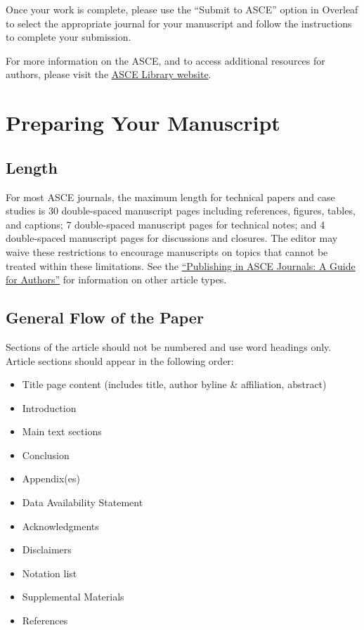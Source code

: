 \documentclass[NewProceedings, InsideFigs,LineNumbers]{asce-quarto}
\begin{document}
Once your work is complete, please use the ``Submit to ASCE'' option in
Overleaf to select the appropriate journal for your manuscript and
follow the instructions to complete your submission.

For more information on the ASCE, and to access additional resources for
authors, please visit the
\href{http://ascelibrary.org/page/authors}{ASCE Library website}.

\section{Preparing Your Manuscript}\label{preparing-your-manuscript}

\subsection{Length}\label{length}

For most ASCE journals, the maximum length for technical papers and case
studies is 30 double-spaced manuscript pages including references,
figures, tables, and captions; 7 double-spaced manuscript pages for
technical notes; and 4 double-spaced manuscript pages for discussions
and closures. The editor may waive these restrictions to encourage
manuscripts on topics that cannot be treated within these limitations.
See the
\href{https://ascelibrary.org/doi/pdf/10.1061/9780784479018}{``Publishing
in ASCE Journals: A Guide for Authors''} for information on other
article types.

\subsection{General Flow of the Paper}\label{general-flow-of-the-paper}

Sections of the article should not be numbered and use word headings
only. Article sections should appear in the following order:

\begin{itemize}
\item
  Title page content (includes title, author byline \& affiliation,
  abstract)
\item
  Introduction
\item
  Main text sections
\item
  Conclusion
\item
  Appendix(es)
\item
  Data Availability Statement
\item
  Acknowledgments
\item
  Disclaimers
\item
  Notation list
\item
  Supplemental Materials
\item
  References
\end{itemize}
\end{document}
